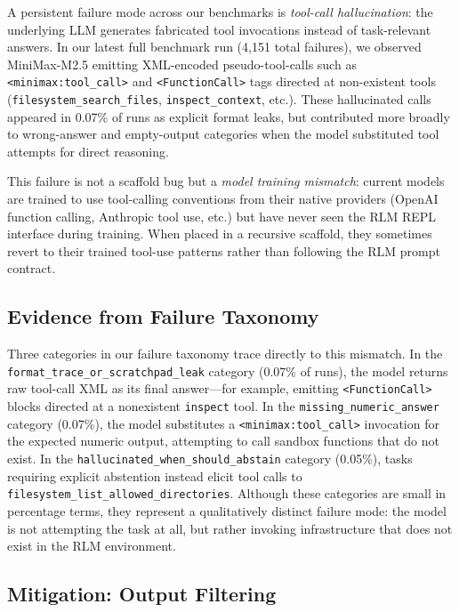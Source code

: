 \documentclass[11pt]{article}
\begin{document}
A persistent failure mode across our benchmarks is \emph{tool-call hallucination}: the underlying LLM generates fabricated tool invocations instead of task-relevant answers. In our latest full benchmark run (4{,}151 total failures), we observed MiniMax-M2.5 emitting XML-encoded pseudo-tool-calls such as \texttt{<minimax:tool\_call>} and \texttt{<FunctionCall>} tags directed at non-existent tools (\texttt{filesystem\_search\_files}, \texttt{inspect\_context}, etc.). These hallucinated calls appeared in 0.07\% of runs as explicit format leaks, but contributed more broadly to wrong-answer and empty-output categories when the model substituted tool attempts for direct reasoning.

This failure is not a scaffold bug but a \emph{model training mismatch}: current models are trained to use tool-calling conventions from their native providers (OpenAI function calling, Anthropic tool use, etc.) but have never seen the RLM REPL interface during training. When placed in a recursive scaffold, they sometimes revert to their trained tool-use patterns rather than following the RLM prompt contract.

\subsection{Evidence from Failure Taxonomy}

Three categories in our failure taxonomy trace directly to this mismatch. In the \texttt{format\_trace\_or\_scratchpad\_leak} category (0.07\% of runs), the model returns raw tool-call XML as its final answer---for example, emitting \texttt{<FunctionCall>} blocks directed at a nonexistent \texttt{inspect} tool. In the \texttt{missing\_numeric\_answer} category (0.07\%), the model substitutes a \texttt{<minimax:tool\_call>} invocation for the expected numeric output, attempting to call sandbox functions that do not exist. In the \texttt{hallucinated\_when\_should\_abstain} category (0.05\%), tasks requiring explicit abstention instead elicit tool calls to \texttt{filesystem\_list\_allowed\_directories}. Although these categories are small in percentage terms, they represent a qualitatively distinct failure mode: the model is not attempting the task at all, but rather invoking infrastructure that does not exist in the RLM environment.

\subsection{Mitigation: Output Filtering}
\end{document}
